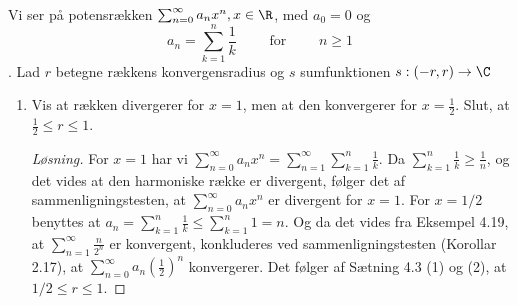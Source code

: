\begin{opg}\hfill\\
	Vi ser på potensrækken $ \sum_{n=0}^{\infty}a_n x^n, x\in \R $, med $ a_0=0 $ og $$ a_n=\sum_{k=1}^{n}\frac1k \qquad\text{ for }\qquad n\geq1 $$. Lad $ r $ betegne rækkens konvergensradius og $ s $ sumfunktionen $ s: (-r,r)\to \C $
\begin{enumerate}
    \item Vis at rækken divergerer for $ x=1 $, men at den konvergerer for $ x=\frac{1}{2} $. Slut, at $ \frac{1}{2}\leq r\leq1 $.
    \ifanswers
    \begin{proof}[Løsning]
    	For $ x=1 $ har vi $ \sum_{n=0}^{\infty}a_n x^n=\sum_{n=1}^{\infty}\sum_{k=1}^{n}\frac{1}{k} $. Da $ \sum_{k=1}^{n}\frac{1}{k}\geq \frac1n $, og det vides at den harmoniske række er divergent, følger det af sammenligningstesten, at $ \sum_{n=0}^{\infty}a_n x^n $ er divergent for $ x=1 $. For $ x=1/2 $ benyttes at $ a_n=\sum_{k=1}^{n}\frac{1}{k}\leq \sum_{k=1}^{n}1=n $. Og da det vides fra Eksempel 4.19, at $ \sum_{n=1}^{\infty}\frac{n}{2^n} $ er konvergent, konkluderes ved sammenligningstesten (Korollar 2.17), at $ \sum_{n=0}^{\infty}a_n \left(\frac{1}{2}\right)^n $ konvergerer. Det følger af Sætning 4.3 (1) og (2), at $  1/2\leq r\leq 1 $.
    	

\end{proof}
\end{enumerate}
\end{opg}
